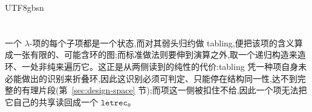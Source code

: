 \begin{CJK*}{UTF8}{gbsn}
  \section{}\label{sec:conclusion}
  \ifPaperChinese
  一个 $\lambda$-项的每个子项都是一个状态,而对其弱头归约做 tabling,便把该项的含义算成一张有限的、可能含环的图;而标准做法则要伸到演算之外,取一个递归构造来造环、一处非纯来遍历它。这正是从两侧读到的纯性的代价:tabling 凭一种项自身未必能做出的识别来折叠环,因此这识别必须可判定、只能停在结构同一性,达不到完整的有理片段(第~\ref{sec:design-space} 节);而项这一侧被扣住不给,因此一个项无法把它自己的共享读回成一个 $\mathtt{letrec}$。


\end{CJK*}
